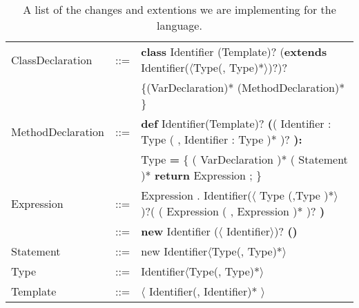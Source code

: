 \begin{table}[h]
  \caption{A list of the changes and extentions we are implementing for the language.}
  \begin{tabular}{ l  c  l}
    \hline
    ClassDeclaration & ::= & \textbf{class} Identifier (Template)?
    (\textbf{extends} Identifier($\langle$Type(, Type)*$\rangle$)?)?  \\
    && \{(VarDeclaration)* (MethodDeclaration)* \}  \\
    \hline
    MethodDeclaration & ::= & \textbf{def} Identifier(Template)?
    \textbf{(}( Identifier : Type ( , Identifier : Type )* )? \textbf{):}\\
    &&Type \textbf{=}
    \{ ( VarDeclaration )* ( Statement )*
    \textbf{return} Expression ; \}\\
    \hline
    Expression & ::= &  Expression . Identifier($\langle$ Type (,Type )*$\rangle$ )?( ( Expression ( , Expression )* )? \textbf{)} \\
    & ::= & \textbf{new} Identifier ($\langle$ Identifier$\rangle$)? \textbf{()} \\
    \hline
    Statement & ::= & new Identifier$\langle$Type(, Type)*$\rangle$ \\
    \hline
    Type & ::= & Identifier$\langle$Type(, Type)*$\rangle$ \\
    \hline
    Template & ::= & $\langle$ Identifier(, Identifier)* $\rangle$ \\
    \hline
  \end{tabular}
\end{table}
